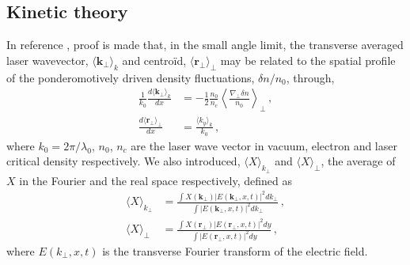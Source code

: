 \documentclass[%
 reprint,
 amsmath,amssymb,
 aps,
]{revtex4-1}
\begin{document}
\subsection{Kinetic theory}
In reference \cite{POP_Rose_96}, proof is made that, in the small angle limit,  the transverse averaged laser wavevector, $ \langle \mathbf{k}_\perp\rangle_{k} $ and centro\"id, $ \langle \mathbf{r}_\perp \rangle_\perp$ may be related to the spatial profile of the  ponderomotively driven density fluctuations, $\delta n /n_0$, through,
\begin{align}
 \frac{1}{k_0}\frac{d \langle \mathbf{k}_\perp\rangle_{k}    }{d x}& =- \frac{1  }{2} \frac{n_0 }{n_c}   \left \langle \frac{\nabla_\perp \delta n }{n_0}  \right  \rangle_\perp   \, ,\label{eq:rose26}\\
  \frac{d \langle \mathbf{r}_\perp\rangle_\perp    }{d x} &= \frac{ \langle k_y\rangle_{k}  }{k_0} \, ,\label{eq:rose24}
\end{align}
where $k_0=2\pi/\lambda_0$, $n_0$, $n_c$ are the laser wave vector in vacuum, electron and laser critical density respectively.
We also introduced, $ \langle X\rangle_{k_\perp} $ and  $ \langle X\rangle_\perp $, the  average of $ X $ in the Fourier and the real space respectively, defined as
\begin{align}
\langle X \rangle_{k_\perp} &= \frac{\int X(\mathbf{k}_\perp) \vert E(\mathbf{k}_\perp,x,t) \vert^2 dk_\perp }{\int   \vert E(\mathbf{k}_\perp,x,t) \vert^2 dk_\perp}\, , \label{eq:kmoy}\\
\langle X \rangle_\perp&= \frac{\int X(\mathbf{r}_\perp)\vert E(\mathbf{r}_\perp,x,t) \vert^2 dy }{\int   \vert E(\mathbf{r}_\perp,x,t) \vert^2 dy}\, , \label{eq:ymoy}
\end{align}
where $ E(k_\perp,x,t) $ is the transverse Fourier transform of the electric field.
\end{document}
